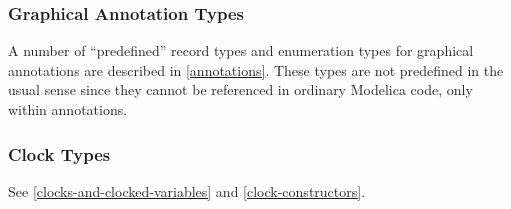 \subsubsection{Graphical Annotation Types}\label{graphical-annotation-types}

A number of ``predefined'' record types and enumeration types for graphical annotations are described in \cref{annotations}.
These types are not predefined in the usual sense since they cannot be referenced in ordinary Modelica code, only within annotations.

\subsubsection{Clock Types}\label{clock-types}

See \cref{clocks-and-clocked-variables} and \cref{clock-constructors}.
